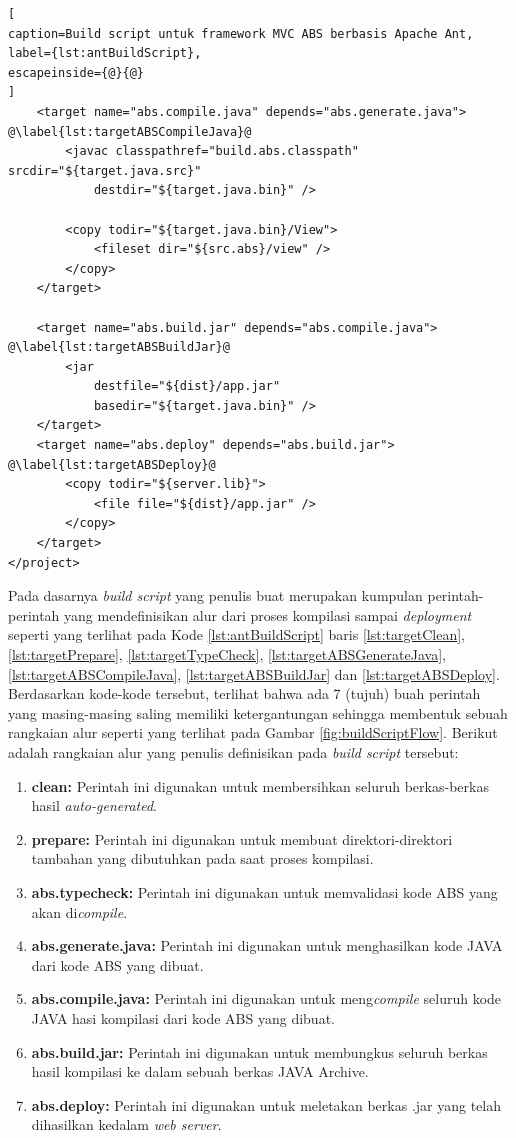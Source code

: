 \begin{lstlisting}[
caption=Build script untuk framework MVC ABS berbasis Apache Ant,
label={lst:antBuildScript},
escapeinside={@}{@}
]
	<target name="abs.compile.java" depends="abs.generate.java"> @\label{lst:targetABSCompileJava}@
		<javac classpathref="build.abs.classpath" srcdir="${target.java.src}"
			destdir="${target.java.bin}" />
			
		<copy todir="${target.java.bin}/View">
			<fileset dir="${src.abs}/view" />
		</copy>
	</target>
	
	<target name="abs.build.jar" depends="abs.compile.java"> @\label{lst:targetABSBuildJar}@
		<jar 
			destfile="${dist}/app.jar"
			basedir="${target.java.bin}" />
	</target>
	<target name="abs.deploy" depends="abs.build.jar"> @\label{lst:targetABSDeploy}@
		<copy todir="${server.lib}">
			<file file="${dist}/app.jar" />
		</copy>
	</target>
</project>
\end{lstlisting}

Pada dasarnya \textit{build script} yang penulis buat merupakan kumpulan perintah-perintah yang mendefinisikan alur dari proses kompilasi sampai \textit{deployment} seperti yang terlihat pada Kode \ref{lst:antBuildScript} baris \ref{lst:targetClean}, \ref{lst:targetPrepare}, \ref{lst:targetTypeCheck}, \ref{lst:targetABSGenerateJava}, \ref{lst:targetABSCompileJava}, \ref{lst:targetABSBuildJar} dan \ref{lst:targetABSDeploy}. Berdasarkan kode-kode tersebut, terlihat bahwa ada 7 (tujuh) buah perintah yang masing-masing saling memiliki ketergantungan sehingga membentuk sebuah rangkaian alur seperti yang terlihat pada Gambar \ref{fig:buildScriptFlow}. Berikut adalah rangkaian alur yang penulis definisikan pada \textit{build script} tersebut:

\begin{enumerate}
    \item \textbf{clean:} Perintah ini digunakan untuk membersihkan seluruh berkas-berkas hasil \textit{auto-generated}.
    \item \textbf{prepare:} Perintah ini digunakan untuk membuat direktori-direktori tambahan yang dibutuhkan pada saat proses kompilasi.
    \item \textbf{abs.typecheck:} Perintah ini digunakan untuk memvalidasi kode ABS yang akan di\textit{compile}.
    \item \textbf{abs.generate.java:} Perintah ini digunakan untuk menghasilkan kode JAVA dari kode ABS yang dibuat.
    \item \textbf{abs.compile.java:} Perintah ini digunakan untuk meng\textit{compile} seluruh kode JAVA hasi kompilasi dari kode ABS yang dibuat.
    \item \textbf{abs.build.jar:} Perintah ini digunakan untuk membungkus seluruh berkas hasil kompilasi ke dalam sebuah berkas JAVA Archive.
    \item \textbf{abs.deploy:} Perintah ini digunakan untuk meletakan berkas .jar yang telah dihasilkan kedalam \textit{web server}.
\end{enumerate}


